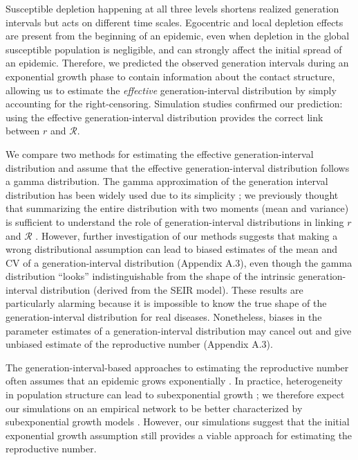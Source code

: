 \documentclass[12pt]{article}
\newcommand{\RR}{\ensuremath{{\mathcal R}}}
\begin{document}
Susceptible depletion happening at all three levels shortens realized generation intervals but acts on different time scales.
Egocentric and local depletion effects are present from the beginning of an epidemic, even when depletion in the global susceptible population is negligible, and can strongly affect the initial spread of an epidemic.
Therefore, we predicted the observed generation intervals during an exponential growth phase to contain information about the contact structure, allowing us to estimate the \emph{effective} generation-interval distribution by simply accounting for the right-censoring.
Simulation studies confirmed our prediction: using the effective generation-interval distribution provides the correct link between $r$ and $\RR$.

We compare two methods for estimating the effective generation-interval distribution and assume that the effective generation-interval distribution follows a gamma distribution.
The gamma approximation of the generation interval distribution has been widely used due to its simplicity \citep{mcbryde2009early, nishiura2009transmission, roberts2011early, trichereau2012estimation, nishiura2015theoretical};
we previously thought that summarizing the entire distribution with two moments (mean and variance) is sufficient to understand the role of generation-interval distributions in linking $r$ and $\RR$ \citep{park2019practical}.
However, further investigation of our methods suggests that making a wrong distributional assumption can lead to biased estimates of the mean and CV of a generation-interval distribution (Appendix A.3), even though the gamma distribution ``looks'' indistinguishable from the shape of the intrinsic generation-interval distribution (derived from the SEIR model).
These results are particularly alarming because it is impossible to know the true shape of the generation-interval distribution for real diseases.
Nonetheless, biases in the parameter estimates of a generation-interval distribution may cancel out and give unbiased estimate of the reproductive number (Appendix A.3).

The generation-interval-based approaches to estimating the reproductive number often assumes that an epidemic grows exponentially \citep{wearing2005appropriate, wallinga2007generation, roberts2007model, park2019practical}.
In practice, heterogeneity in population structure can lead to subexponential growth \citep{szendroi2004polynomial, chowell2015western, chowell2016growing, chowell2016characterizing, kiskowski2016modeling, viboud2016generalized};
we therefore expect our simulations on an empirical network to be better characterized by subexponential growth models \citep{viboud2016generalized}.
However, our simulations suggest that the initial exponential growth assumption still provides a viable approach for estimating the reproductive number.
\end{document}
